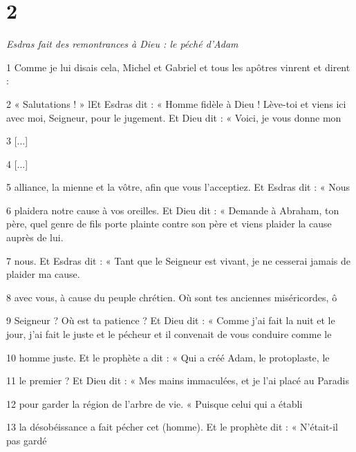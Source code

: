 \chapter{2}

\par \textit{Esdras fait des remontrances à Dieu : le péché d'Adam}

\par 1 Comme je lui disais cela, Michel et Gabriel et tous les apôtres vinrent et dirent :

\par 2 « Salutations ! » lEt Esdras dit : « Homme fidèle à Dieu ! Lève-toi et viens ici avec moi, Seigneur, pour le jugement. Et Dieu dit : « Voici, je vous donne mon

\par 3 [...]

\par 4 [...]

\par 5 alliance, la mienne et la vôtre, afin que vous l'acceptiez. Et Esdras dit : « Nous

\par 6 plaidera notre cause à vos oreilles. Et Dieu dit : « Demande à Abraham, ton père, quel genre de fils porte plainte contre son père et viens plaider la cause auprès de lui.

\par 7 nous. Et Esdras dit : « Tant que le Seigneur est vivant, je ne cesserai jamais de plaider ma cause.

\par 8 avec vous, à cause du peuple chrétien. Où sont tes anciennes miséricordes, ô

\par 9 Seigneur ? Où est ta patience ? Et Dieu dit : « Comme j’ai fait la nuit et le jour, j’ai fait le juste et le pécheur et il convenait de vous conduire comme le

\par 10 homme juste. Et le prophète a dit : « Qui a créé Adam, le protoplaste, le

\par 11 le premier ? Et Dieu dit : « Mes mains immaculées, et je l'ai placé au Paradis

\par 12 pour garder la région de l'arbre de vie. « Puisque celui qui a établi

\par 13 la désobéissance a fait pécher cet (homme). Et le prophète dit : « N'était-il pas gardé

